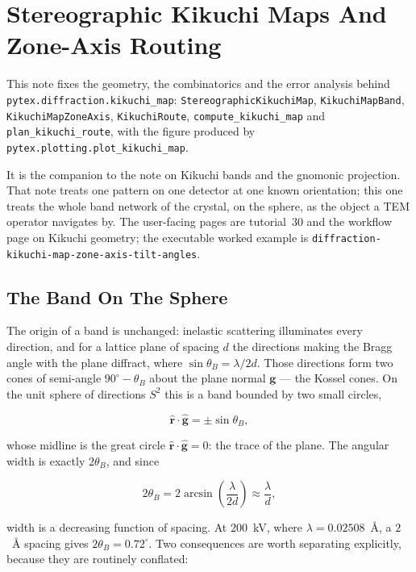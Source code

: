 \section{Stereographic Kikuchi Maps And Zone-Axis Routing}

This note fixes the geometry, the combinatorics and the error analysis behind
\texttt{pytex.diffraction.kikuchi\_map}:
\texttt{StereographicKikuchiMap}, \texttt{KikuchiMapBand},
\texttt{KikuchiMapZoneAxis}, \texttt{KikuchiRoute},
\texttt{compute\_kikuchi\_map} and \texttt{plan\_kikuchi\_route}, with the figure
produced by \texttt{pytex.plotting.plot\_kikuchi\_map}.

It is the companion to the note on Kikuchi bands and the gnomonic projection.
That note treats one pattern on one detector at one known orientation; this one
treats the whole band network of the crystal, on the sphere, as the object a TEM
operator navigates by. The user-facing pages are tutorial~30 and the workflow page
on Kikuchi geometry; the executable worked example is
\texttt{diffraction-kikuchi-map-zone-axis-tilt-angles}.

\subsection{The Band On The Sphere}

The origin of a band is unchanged: inelastic scattering illuminates every
direction, and for a lattice plane of spacing $d$ the directions making the Bragg
angle with the plane diffract, where $\sin\theta_B = \lambda/2d$. Those directions
form two cones of semi-angle $90^\circ - \theta_B$ about the plane normal
$\mathbf{g}$ --- the Kossel cones. On the unit sphere of directions $S^2$ this is a
band bounded by two small circles,

\[
  \hat{\mathbf{r}} \cdot \hat{\mathbf{g}} = \pm \sin\theta_B ,
\]

whose midline is the great circle $\hat{\mathbf{r}} \cdot \hat{\mathbf{g}} = 0$:
the trace of the plane. The angular width is exactly $2\theta_B$, and since

\begin{equation}
  2\theta_B = 2\arcsin\!\left(\frac{\lambda}{2d}\right) \approx \frac{\lambda}{d},
  \label{eq:band-width}
\end{equation}

width is a decreasing function of spacing. At $200$~kV, where
$\lambda = 0.02508$~\AA, a $2$~\AA{} spacing gives $2\theta_B = 0.72^\circ$. Two
consequences are worth separating explicitly, because they are routinely
conflated:

